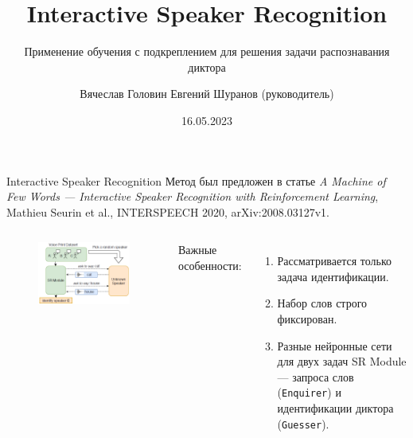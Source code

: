 \documentclass[aspectratio=169]{beamer}
\title{Interactive Speaker Recognition}
\subtitle{Применение обучения с подкреплением для решения задачи распознавания
          диктора}
\author[В.С.~Головин]{Вячеслав Головин \texorpdfstring{\newline}{, }
    {\small Евгений Шуранов (руководитель)}}
\institute[ВШЭ]{Huawei CBG AI и ФКН ВШЭ СПб}
\date{16.05.2023}
\newcommand{\guesser}{\texttt{Guesser}}
\newcommand{\enquirer}{\texttt{Enquirer}}
\begin{document}
\frame{\titlepage}

\begin{frame}{}

\end{frame}

\begin{frame}{Interactive Speaker Recognition}
    Метод был предложен в статье \textit{A Machine of Few Words --- Interactive
    Speaker Recognition with Reinforcement Learning}, Mathieu Seurin et al.,
    INTERSPEECH 2020, arXiv:2008.03127v1.\vspace{1em}

    \begin{columns}
    
    \begin{figure}[bht]
        \includegraphics[width=.9\textwidth]{isr_game_large.png}
    \end{figure}

    Важные особенности:
    \begin{enumerate}
        \item Рассматривается только задача идентификации.
        \item Набор слов строго фиксирован.
        \item Разные нейронные сети для двух задач SR Module --- запроса слов
        (\enquirer) и идентификации диктора (\guesser).
    \end{enumerate}
    \end{columns}
\end{frame}
\end{document}
